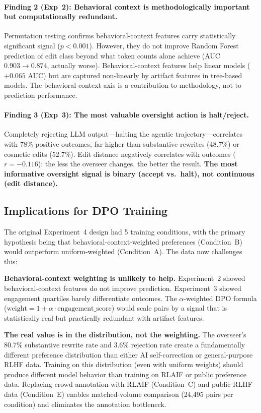 \documentclass[11pt]{article}
\begin{document}
\paragraph{Finding 2 (Exp~2): Behavioral context is methodologically important but computationally redundant.}
Permutation testing confirms behavioral-context features carry statistically significant signal ($p < 0.001$).
However, they do not improve Random Forest prediction of edit class beyond what token counts alone achieve (AUC $0.903 \to 0.874$, actually worse).
Behavioral-context features help linear models ($+0.065$ AUC) but are captured non-linearly by artifact features in tree-based models.
The behavioral-context axis is a contribution to methodology, not to prediction performance.

\paragraph{Finding 3 (Exp~3): The most valuable oversight action is halt/reject.}
Completely rejecting LLM output---halting the agentic trajectory---correlates with 78\% positive outcomes, far higher than substantive rewrites (48.7\%) or cosmetic edits (52.7\%).
Edit distance negatively correlates with outcomes ($r = -0.116$): the less the overseer changes, the better the result.
\textbf{The most informative oversight signal is binary (accept vs.\ halt), not continuous (edit distance).}

\subsection{Implications for DPO Training}

The original Experiment~4 design had 5 training conditions, with the primary hypothesis being that behavioral-context-weighted preferences (Condition~B) would outperform uniform-weighted (Condition~A).
The data now challenges this:

\textbf{Behavioral-context weighting is unlikely to help.}
Experiment~2 showed behavioral-context features do not improve prediction.
Experiment~3 showed engagement quartiles barely differentiate outcomes.
The $\alpha$-weighted DPO formula ($\text{weight} = 1 + \alpha \cdot \text{engagement\_score}$) would scale pairs by a signal that is statistically real but practically redundant with artifact features.

\textbf{The real value is in the distribution, not the weighting.}
The overseer's 80.7\% substantive rewrite rate and 3.6\% rejection rate create a fundamentally different preference distribution than either AI self-correction or general-purpose RLHF data.
Training on this distribution (even with uniform weights) should produce different model behavior than training on RLAIF or public preference data.
Replacing crowd annotation with RLAIF (Condition~C) and public RLHF data (Condition~E) enables matched-volume comparison (24{,}495 pairs per condition) and eliminates the annotation bottleneck.
\end{document}
